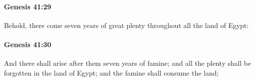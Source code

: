 		\paragraph{Genesis 41:29} %
			\label{GENESIS-41-29}

			Behold, there come seven years of great plenty throughout all the land of Egypt:


		\paragraph{Genesis 41:30} %
			\label{GENESIS-41-30}

			And there shall arise after them seven years of famine; and all the plenty shall be forgotten in the land of Egypt; and the famine shall consume the land;


